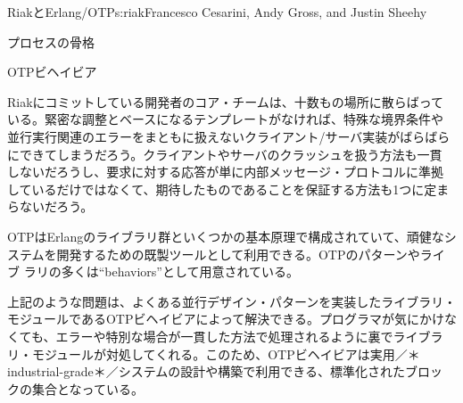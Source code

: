 \begin{aosachapter}{RiakとErlang/OTP}{s:riak}{Francesco Cesarini, Andy Gross, and Justin Sheehy}
\begin{aosasect1}{プロセスの骨格}
\end{aosasect1}

\begin{aosasect1}{OTPビヘイビア}


Riakにコミットしている開発者のコア・チームは、十数もの場所に散らばって
いる。緊密な調整とベースになるテンプレートがなければ、特殊な境界条件や
並行実行関連のエラーをまともに扱えないクライアント/サーバ実装がばらばら
にできてしまうだろう。クライアントやサーバのクラッシュを扱う方法も一貫
しないだろうし、要求に対する応答が単に内部メッセージ・プロトコルに準拠
しているだけではなくて、期待したものであることを保証する方法も1つに定ま
らないだろう。


OTPはErlangのライブラリ群といくつかの基本原理で構成されていて、頑健なシ
ステムを開発するための既製ツールとして利用できる。OTPのパターンやライブ
ラリの多くは``behaviors''として用意されている。


上記のような問題は、よくある並行デザイン・パターンを実装したライブラリ・
モジュールであるOTPビヘイビアによって解決できる。プログラマが気にかけな
くても、エラーや特別な場合が一貫した方法で処理されるように裏でライブラ
リ・モジュールが対処してくれる。このため、OTPビヘイビアは実用／＊
industrial-grade＊／システムの設計や構築で利用できる、標準化されたブロッ
クの集合となっている。


\end{aosasect1}
\end{aosachapter}
